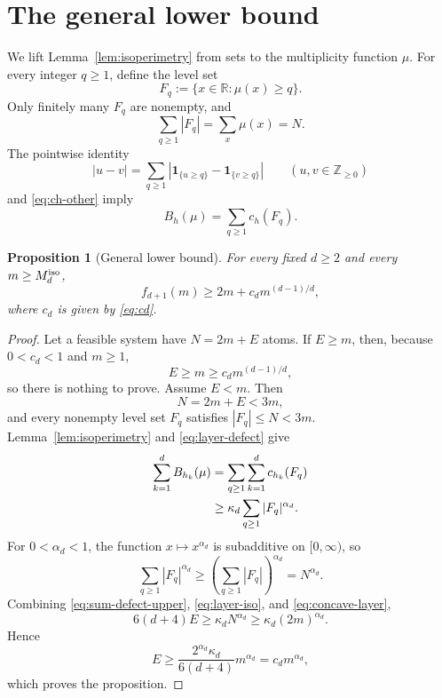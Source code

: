 \documentclass[11pt]{article}
\newtheorem{proposition}[theorem]{Proposition}
\theoremstyle{definition}
\newcommand{\R}{\mathbb{R}}
\newcommand{\Z}{\mathbb{Z}}
\newcommand{\1}{\mathbf{1}}
\begin{document}
\section{The general lower bound}

We lift Lemma~\ref{lem:isoperimetry} from sets to the multiplicity function $\mu$.  For every integer $q\ge1$, define the level set
\begin{equation}\label{eq:Fq}
  F_q:=\{x\in\R:\mu(x)\ge q\}.
\end{equation}
Only finitely many $F_q$ are nonempty, and
\begin{equation}\label{eq:layer-mass}
  \sum_{q\ge1}|F_q|=\sum_x\mu(x)=N.
\end{equation}
The pointwise identity
\[
  |u-v|=\sum_{q\ge1}\left|\1_{\{u\ge q\}}-\1_{\{v\ge q\}}\right|
  \qquad(u,v\in\Z_{\ge0})
\]
and \eqref{eq:ch-other} imply
\begin{equation}\label{eq:layer-defect}
  B_h(\mu)=\sum_{q\ge1}c_h(F_q).
\end{equation}

\begin{proposition}[General lower bound]\label{prop:lower}
For every fixed $d\ge2$ and every $m\ge M_d^{\rm iso}$,
\[
  f_{d+1}(m)\ge2m+c_dm^{(d-1)/d},
\]
where $c_d$ is given by \eqref{eq:cd}.
\end{proposition}

\begin{proof}
Let a feasible system have $N=2m+E$ atoms.  If $E\ge m$, then, because $0<c_d<1$ and $m\ge1$,
\[
  E\ge m\ge c_dm^{(d-1)/d},
\]
so there is nothing to prove.  Assume $E<m$.  Then
\[
  N=2m+E<3m,
\]
and every nonempty level set $F_q$ satisfies $|F_q|\le N<3m$.  Lemma~\ref{lem:isoperimetry} and \eqref{eq:layer-defect} give
\begin{align}
  \sum_{k=1}^d B_{h_k}(\mu)
  &=\sum_{q\ge1}\sum_{k=1}^d c_{h_k}(F_q)\notag\\
  &\ge\kappa_d\sum_{q\ge1}|F_q|^{\alpha_d}.\label{eq:layer-iso}
\end{align}
For $0<\alpha_d<1$, the function $x\mapsto x^{\alpha_d}$ is subadditive on $[0,\infty)$, so
\begin{equation}\label{eq:concave-layer}
  \sum_{q\ge1}|F_q|^{\alpha_d}
  \ge\left(\sum_{q\ge1}|F_q|\right)^{\alpha_d}
  =N^{\alpha_d}.
\end{equation}
Combining \eqref{eq:sum-defect-upper}, \eqref{eq:layer-iso}, and \eqref{eq:concave-layer},
\[
  6(d+4)E
  \ge\kappa_dN^{\alpha_d}
  \ge\kappa_d(2m)^{\alpha_d}.
\]
Hence
\[
  E\ge\frac{2^{\alpha_d}\kappa_d}{6(d+4)}m^{\alpha_d}
  =c_dm^{\alpha_d},
\]
which proves the proposition.
\end{proof}
\end{document}
